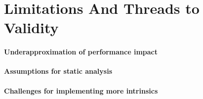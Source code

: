 \section{Limitations And Threads to Validity}


\paragraph{Underapproximation of performance impact}
\paragraph{Assumptions for static analysis}
\paragraph{Challenges for implementing more intrinsics}


